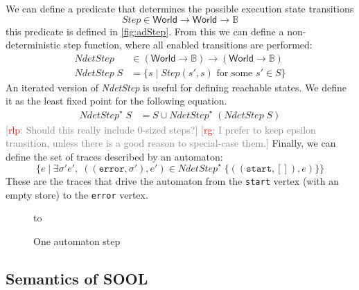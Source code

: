 \documentclass[preprint]{sigplanconf} %
\newcommand{\note}[2]{\textcolor{gray}{[\textcolor{red}{#1}: #2]}}
\newcommand{\rg}[1]{\note{rg}{#1}}
\newcommand{\rlp}[1]{\note{rlp}{#1}}
\newcommand{\B}{\ensuremath{\mathbb{B}}}
\newcommand{\set}[1]{\ensuremath{\mathsf{#1}}}
\theoremstyle{definition}
\theoremstyle{remark}
\begin{document}
We can define a predicate that determines the possible execution state transitions
\[
\mathit{Step}\in\set{World}\to\set{World}\to\B
\]
this predicate is defined in \autoref{fig:adStep}.
From this we can define a non-deterministic step function, where all
enabled transitions are performed:
\begin{align}
\mathit{NdetStep}&\in(\set{World}\to\B)\to(\set{World}\to\B)\\
\mathit{NdetStep}\;S&=\{ s \mid \text{$\mathit{Step}(s', s)$ for some $s'\in S$} \} \label{eq:ndetstep}
\end{align}
An iterated version of \textit{NdetStep} is useful for defining reachable states.
We define it as the least fixed point for the following equation.
\begin{align}
\mathit{NdetStep}^\star\;S &= S \cup \mathit{NdetStep}^\star\;(\mathit{NdetStep}\;S)
\end{align}
\rlp{Should this really include 0-sized steps?}
\rg{I prefer to keep epsilon transition, unless there is a good reason to special-case them.}
Finally, we can define the set of traces described by an automaton:
\[
\{ e \mid
\exists\sigma'e',\;((\mathtt{error},\sigma'),e')\in\mathit{NdetStep}^\star\;\{((\mathtt{start},[]),e)\}
\}
\]
These are the traces that drive the automaton from the \texttt{start} vertex (with an empty store) to the \texttt{error} vertex.
\begin{figure}
\hbox to
\caption{One automaton step}
\label{fig:adStep}
\end{figure}
\subsection{Semantics of SOOL} \label{sec:semantics.sool} %
\end{document}
